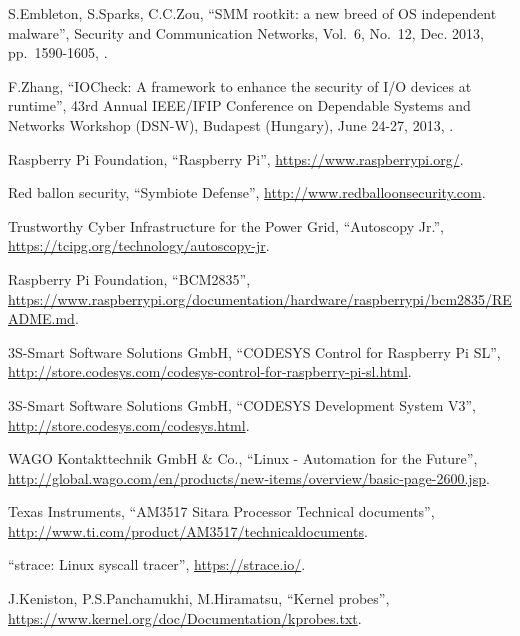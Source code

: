 \begin{thebibliography}{99}
S.Embleton, S.Sparks, C.C.Zou,
``SMM rootkit: a new breed of OS independent malware'',
Security and Communication Networks,
Vol.\ 6, No.\ 12,
Dec. 2013,
pp.\ 1590-1605,
.

F.Zhang,
``IOCheck: A framework to enhance the security of I/O devices at runtime'',
43rd Annual IEEE/IFIP Conference on Dependable Systems and Networks Workshop (DSN-W),
Budapest (Hungary), June 24-27, 2013,
.

Raspberry Pi Foundation,
``Raspberry Pi'',
\url{https://www.raspberrypi.org/}.

Red ballon security,
``Symbiote Defense'',
\url{http://www.redballoonsecurity.com}.

Trustworthy Cyber Infrastructure for the Power Grid,
``Autoscopy Jr.'',
\url{https://tcipg.org/technology/autoscopy-jr}.

Raspberry Pi Foundation,
``BCM2835'',
\url{https://www.raspberrypi.org/documentation/hardware/raspberrypi/bcm2835/README.md}.

3S-Smart Software Solutions GmbH,
``CODESYS Control for Raspberry Pi SL'',
\url{http://store.codesys.com/codesys-control-for-raspberry-pi-sl.html}.

3S-Smart Software Solutions GmbH,
``CODESYS Development System V3'',
\url{http://store.codesys.com/codesys.html}.

WAGO Kontakttechnik GmbH \& Co.,
``Linux - Automation for the Future'',
\url{http://global.wago.com/en/products/new-items/overview/basic-page-2600.jsp}.

Texas Instruments,
``AM3517 Sitara Processor Technical documents'',
\url{http://www.ti.com/product/AM3517/technicaldocuments}.

``strace: Linux syscall tracer'',
\url{https://strace.io/}.

J.Keniston, P.S.Panchamukhi, M.Hiramatsu,
``Kernel probes'',
\url{https://www.kernel.org/doc/Documentation/kprobes.txt}.

\end{thebibliography}
